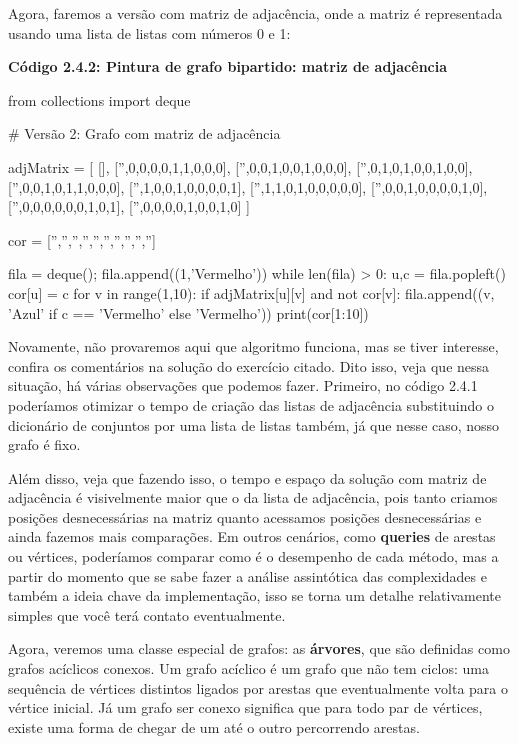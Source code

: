 \documentclass[11pt, a4paper]{article}
\begin{document}
Agora, faremos a versão com matriz de adjacência, onde a matriz é representada usando uma lista de listas com números 0 e 1:

\textbf{Código 2.4.2: Pintura de grafo bipartido: matriz de adjacência}

\begin{code}
from collections import deque

# Versão 2: Grafo com matriz de adjacência

adjMatrix = [
    [],
    ['',0,0,0,0,1,1,0,0,0],
    ['',0,0,1,0,0,1,0,0,0],
    ['',0,1,0,1,0,0,1,0,0],
    ['',0,0,1,0,1,1,0,0,0],
    ['',1,0,0,1,0,0,0,0,1],
    ['',1,1,0,1,0,0,0,0,0],
    ['',0,0,1,0,0,0,0,1,0],
    ['',0,0,0,0,0,0,1,0,1],
    ['',0,0,0,0,1,0,0,1,0]
]

cor = ['','','','','','','','','','']

fila = deque(); fila.append((1,'Vermelho'))
while len(fila) > 0:
    u,c = fila.popleft()
    cor[u] = c
    for v in range(1,10):
        if adjMatrix[u][v] and not cor[v]:
            fila.append((v, 'Azul' if c == 'Vermelho' else 'Vermelho'))
print(cor[1:10])
\end{code}

Novamente, não provaremos aqui que algoritmo funciona, mas se tiver interesse, confira os comentários na solução do exercício citado. Dito isso, veja que nessa situação, há várias observações que podemos fazer. Primeiro, no código 2.4.1 poderíamos otimizar o tempo de criação das listas de adjacência substituindo o dicionário de conjuntos por uma lista de listas também, já que nesse caso, nosso grafo é fixo. 

Além disso, veja que fazendo isso, o tempo e espaço da solução com matriz de adjacência é visivelmente maior que o da lista de adjacência, pois tanto criamos posições desnecessárias na matriz quanto acessamos posições desnecessárias e ainda fazemos mais comparações. Em outros cenários, como \textbf{queries} de arestas ou vértices, poderíamos comparar como é o desempenho de cada método, mas a partir do momento que se sabe fazer a análise assintótica das complexidades e também a ideia chave da implementação, isso se torna um detalhe relativamente simples que você terá contato eventualmente.

Agora, veremos uma classe especial de grafos: as \textbf{árvores}, que são definidas como grafos acíclicos conexos. Um grafo acíclico é um grafo que não tem ciclos: uma sequência de vértices distintos ligados por arestas que eventualmente volta para o vértice inicial. Já um grafo ser conexo significa que para todo par de vértices, existe uma forma de chegar de um até o outro percorrendo arestas.
\end{document}
